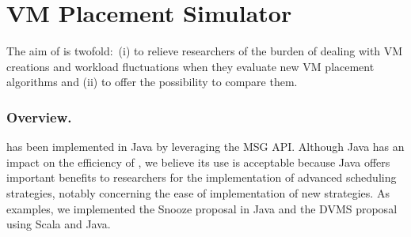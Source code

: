 \section{VM Placement Simulator}
\label{sec:injector}

The aim of \vmps is twofold:~(i) to relieve researchers of the burden of
dealing with VM creations and workload fluctuations when they evaluate
new VM placement algorithms and (ii) to offer the possibility to
compare them.
%
%

\subsubsection{Overview.}
\label{sec:overview}

\vmps has been implemented in Java by leveraging the \sg MSG API.
Although Java has an impact on the efficiency
of \sg, we believe its use is acceptable because Java offers important
benefits to researchers for the implementation of advanced scheduling
strategies, notably concerning the ease of implementation of new
strategies. As examples, we implemented the Snooze proposal in Java
and the DVMS proposal using Scala and Java.

